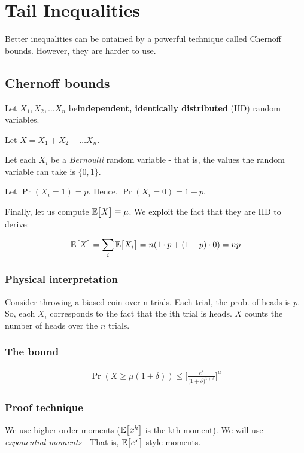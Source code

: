 \chapter{Tail Inequalities}

Better inequalities can be ontained by a powerful technique called
Chernoff bounds. However, they are harder to use.

\section{Chernoff bounds}

Let $X_1, X_2, \dots X_n$ be\textbf{independent, identically
distributed} (IID) random variables.

Let $X = X_1 + X_2 + \dots X_n$.

Let each $X_i$ be a \textit{Bernoulli} random variable - that is, the values
the random variable can take is $\{0, 1\}$.

Let $\Pr(X_i = 1) = p$. Hence, $\Pr(X_i = 0) = 1 - p$.

Finally, let us compute $\mathbb{E}\big[ X \big] \equiv \mu$. We exploit the fact that they are
IID to derive:

$$
\mathbb{E}\big[ X \big] = \sum_i \mathbb{E}\big[ X_i \big] = n (1 \cdot p + (1 - p) \cdot 0) = n p
$$

\subsection{Physical interpretation}

Consider throwing a biased coin over n trials. Each trial, the prob. of
heads is $p$. So, each $X_i$ corresponds to the fact that the ith trial is
heads. $X$ counts the number of heads over the $n$ trials.

\subsection{The bound}

\begin{align*}
\Pr(X \geq \mu (1 + \delta)) \leq 
{\bigg[ \frac{e^\delta}{({1 + \delta)}^{1 + \delta}}} \bigg]^\mu
\end{align*}

\subsection{Proof technique}

We use higher order moments ($\mathbb{E}\big[ x^k \big]$ is the kth moment). We will use
\textit{exponential moments} - That is, $\mathbb{E}\big[ e^x \big]$ style moments.


